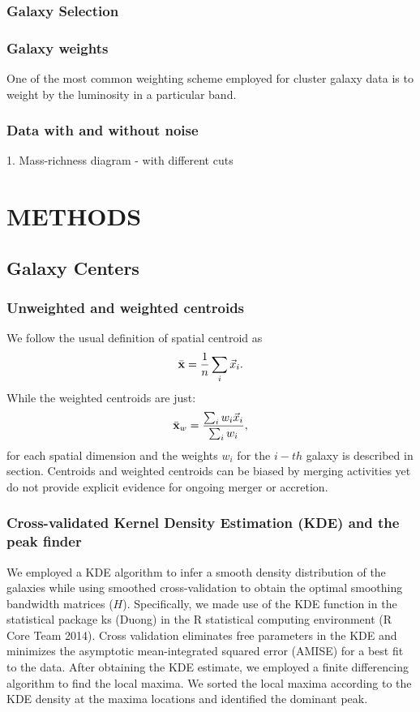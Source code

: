 \documentclass[letterpaper,useAMS,usenatbib]{mn2e}
\begin{document}
\subsubsection{Galaxy Selection}
\subsubsection{Galaxy weights}
One of the most common weighting scheme employed for cluster galaxy data is to weight
by the luminosity in a particular band.

\subsubsection{Data with and without noise}
1. Mass-richness diagram - with different cuts  
\section{METHODS} 

\subsection{Galaxy Centers}
\subsubsection{Unweighted and weighted centroids}
We follow the usual definition of spatial centroid as 
\begin{equation}
	\bar{\bf x} = \frac{1}{n} \sum_i \vec{x}_i. 
\end{equation}
While the weighted centroids are just: 
\begin{equation}
	\bar{\bf x}_w = \frac{\sum_i w_i \vec{x}_i}{\sum_i w_i},
\end{equation}
for each spatial dimension and the weights $w_i$ for the $i-th$ galaxy
is described in section.
Centroids and weighted centroids can be biased by merging activities yet do
not provide explicit evidence for ongoing merger or accretion. 


\subsubsection{Cross-validated Kernel Density Estimation (KDE) and the peak finder} 
We employed a KDE algorithm to infer a smooth density distribution of the
galaxies while using smoothed cross-validation to obtain the optimal smoothing
bandwidth matrices ($H$). Specifically, we made use of the KDE function in
the statistical package ks (Duong) in the R statistical computing environment (R Core Team 2014).
Cross validation eliminates free parameters in the KDE and minimizes
the asymptotic mean-integrated squared error (AMISE) for a best fit to the
data.
After obtaining the KDE estimate, we employed a finite differencing algorithm
to find the local maxima. We sorted the local maxima according to the KDE
density at the maxima locations and identified the dominant peak. 
\end{document}
